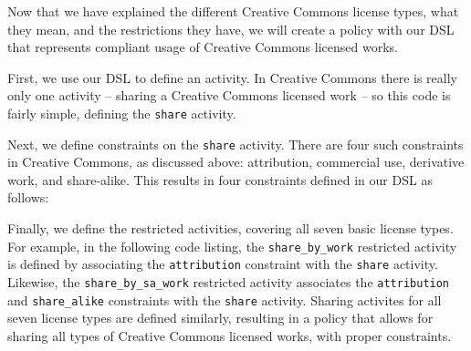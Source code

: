 Now that we have explained the different Creative Commons license types, what
they mean, and the restrictions they have, we will create a policy with our DSL
that represents compliant usage of Creative Commons licensed works.

First, we use our DSL to define an activity.  In Creative Commons there is
really only one activity --  sharing a Creative Commons licensed work -- so
this code is fairly simple, defining the \texttt{share} activity.



Next, we define constraints on the \texttt{share} activity.  There are four
such constraints in Creative Commons, as discussed above: attribution,
commercial use, derivative work, and share-alike.  This results in four
constraints defined in our DSL as follows:



Finally, we define the restricted activities, covering all seven basic license
types.  For example, in the following code listing, the
\texttt{share\_by\_work} restricted activity is defined by associating the
\texttt{attribution} constraint with the \texttt{share} activity. Likewise, the
\texttt{share\_by\_sa\_work} restricted activity associates the
\texttt{attribution} and \texttt{share\_alike} constraints with the
\texttt{share} activity.  Sharing activites for all seven license types are defined
similarly, resulting in a policy that allows for sharing all types of Creative
Commons licensed works, with proper constraints.

